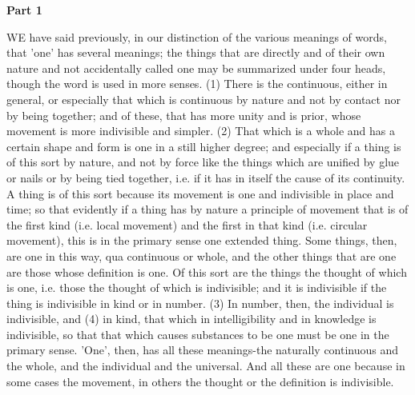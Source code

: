 
\textbf{Part 1}

WE have said previously, in our distinction of the various meanings of words, that 'one' has several meanings; the things that are directly and of their own nature and not accidentally called one may be summarized under four heads, though the word is used in more senses. (1) There is the continuous, either in general, or especially that which is continuous by nature and not by contact nor by being together; and of these, that has more unity and is prior, whose movement is more indivisible and simpler. (2) That which is a whole and has a certain shape and form is one in a still higher degree; and especially if a thing is of this sort by nature, and not by force like the things which are unified by glue or nails or by being tied together, i.e. if it has in itself the cause of its continuity. A thing is of this sort because its movement is one and indivisible in place and time; so that evidently if a thing has by nature a principle of movement that is of the first kind (i.e. local movement) and the first in that kind (i.e. circular movement), this is in the primary sense one extended thing. Some things, then, are one in this way, qua continuous or whole, and the other things that are one are those whose definition is one. Of this sort are the things the thought of which is one, i.e. those the thought of which is indivisible; and it is indivisible if the thing is indivisible in kind or in number. (3) In number, then, the individual is indivisible, and (4) in kind, that which in intelligibility and in knowledge is indivisible, so that that which causes substances to be one must be one in the primary sense. 'One', then, has all these meanings-the naturally continuous and the whole, and the individual and the universal. And all these are one because in some cases the movement, in others the thought or the definition is indivisible.

